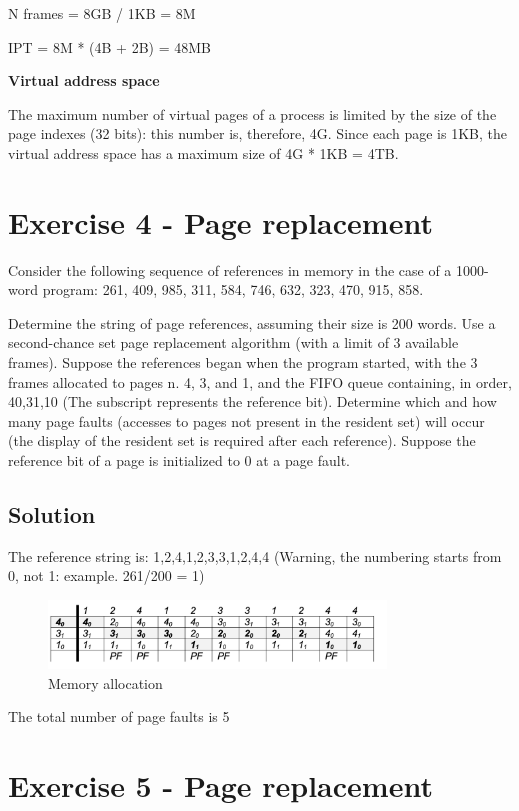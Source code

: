 N frames = 8GB / 1KB = 8M

IPT = 8M * (4B + 2B) = 48MB

\textbf{Virtual address space}

The maximum number of virtual pages of a process is limited by the size of the page indexes (32 bits): this number is, therefore, 4G. Since each page is 1KB, the virtual address space has a maximum size of 4G * 1KB = 4TB.


\section{Exercise 4 - Page replacement}

Consider the following sequence of references in memory in the case of a 1000-word program: 261, 409, 985, 311, 584, 746, 632, 323, 470, 915, 858.

Determine the string of page references, assuming their size is 200 words. Use a second-chance set page replacement algorithm (with a limit of 3 available frames). Suppose the references began when the program started, with the 3 frames allocated to pages n. 4, 3, and 1, and the FIFO queue containing, in order, 40,31,10 (The subscript represents the reference bit). Determine which and how many page faults (accesses to pages not present in the resident set) will occur (the display of the resident set is required after each reference). Suppose the reference bit of a page is initialized to 0 at a page fault.

\subsection{Solution}

The reference string is: 1,2,4,1,2,3,3,1,2,4,4
(Warning, the numbering starts from 0, not 1: example. 261/200 = 1)

\begin{figure}[hbt]
  \includegraphics[width=0.8\textwidth]{images/ex04.png}
  \caption{Memory allocation}
\end{figure}

The total number of page faults is 5

\section{Exercise 5 - Page replacement}

